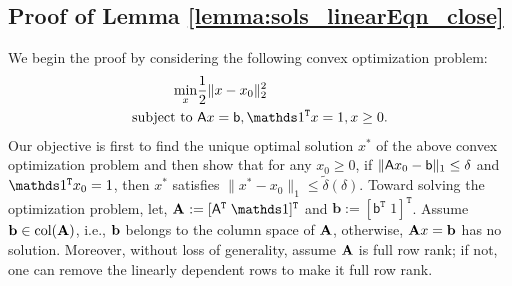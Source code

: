   \subsection{Proof of Lemma \ref{lemma:sols_linearEqn_close}}\label{app:proof:lemma:sols_linearEqn_close}
We begin the proof by considering the following convex optimization problem:
\begin{align}
    \min_{x} & \frac{1}{2}\|x-x_0\|_2^2 \nonumber \\
    \text{subject to } & \sfA x=\mathsf{b}, \I^\texttt{T}x = 1,x \geq 0. 
\end{align}
Our objective is first to find the unique optimal solution $x^*$ of the above convex optimization problem and then show that for any $x_0 \geq 0$, if $\|\mathsf{A} x_0-\mathsf{b}\|_1 \leq \delta$ and $\I^\texttt{T}x_0 = 1$, then  $x^*$ satisfies $\|x^* -x_0\|_1 \leq \tilde{\delta}(\delta)$. 
Toward solving the optimization problem, let, ${\mathbf{A}}_{} := [\sfA^\texttt{T} \; \I]^\texttt{T}$  and ${\mathbf{b}} := [\mathsf{b}^\texttt{T}\; 1]^\texttt{T}$. Assume $\mathbf{b} \in \text{col}(\mathbf{A})$, i.e., $\mathbf{b}$ belongs to the column space of $\mathbf{A}$, otherwise, $\mathbf{A} x=\mathbf{b}$ has no solution. Moreover, without loss of generality, assume $\mathbf{A}$ is full row rank; if not, one can remove the linearly dependent rows to make it full row rank.

